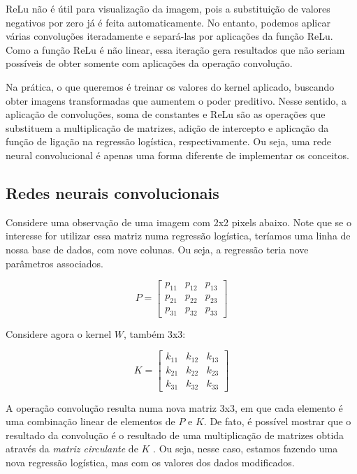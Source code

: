 \documentclass[12pt,]{report}
\begin{document}
ReLu não é útil para visualização da imagem, pois a substituição de
valores negativos por zero já é feita automaticamente. No entanto,
podemos aplicar várias convoluções iteradamente e separá-las por
aplicações da função ReLu. Como a função ReLu é não linear, essa
iteração gera resultados que não seriam possíveis de obter somente com
aplicações da operação convolução.

Na prática, o que queremos é treinar os valores do kernel aplicado,
buscando obter imagens transformadas que aumentem o poder preditivo.
Nesse sentido, a aplicação de convoluções, soma de constantes e ReLu são
as operações que substituem a multiplicação de matrizes, adição de
intercepto e aplicação da função de ligação na regressão logística,
respectivamente. Ou seja, uma rede neural convolucional é apenas uma
forma diferente de implementar os conceitos.

\subsection{Redes neurais
convolucionais}\label{redes-neurais-convolucionais}

Considere uma observação de uma imagem com 2x2 pixels abaixo. Note que
se o interesse for utilizar essa matriz numa regressão logística,
teríamos uma linha de nossa base de dados, com nove colunas. Ou seja, a
regressão teria nove parâmetros associados.

\[
P = \left[\begin{array}{rrr}
p_{11} & p_{12} & p_{13} \\ 
p_{21} & p_{22} & p_{23} \\
p_{31} & p_{32} & p_{33}
\end{array}\right]
\]

Considere agora o kernel \(W\), também 3x3:

\[
K = \left[\begin{array}{rrr}
k_{11} & k_{12} & k_{13} \\ 
k_{21} & k_{22} & k_{23} \\
k_{31} & k_{32} & k_{33}
\end{array}\right]
\]

A operação convolução resulta numa nova matriz 3x3, em que cada elemento
é uma combinação linear de elementos de \(P\) e \(K\). De fato, é
possível mostrar que o resultado da convolução é o resultado de uma
multiplicação de matrizes obtida através da \emph{matriz circulante} de
\(K\) \citep{gray2006toeplitz}. Ou seja, nesse caso, estamos fazendo uma
nova regressão logística, mas com os valores dos dados modificados.
\end{document}
